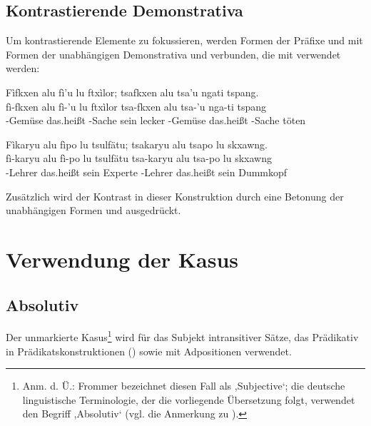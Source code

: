 \subsection{Kontrastierende Demonstrativa}
Um kontrastierende Elemente zu fokussieren, werden Formen der Präfixe  und  mit Formen der unabhängigen Demonstrativa  und  verbunden, die mit  verwendet werden:

\begin{interlin}
	\glll \Npawl{}Fìfkxen alu fì'u lu ftxìlor; tsafkxen alu tsa'u ngati tspang. \\
	fì-fkxen alu fì-'u lu ftxìlor tsa-fkxen alu tsa-'u nga-ti tspang \\
	-Gemüse das.heißt -Sache sein lecker -Gemüse das.heißt -Sache  töten \\
\end{interlin}

\begin{interlin}
	\glll \Npawl{}Fìkaryu alu fìpo lu tsulfätu; tsakaryu alu tsapo lu skxawng. \\
	fì-karyu alu fì-po lu tsulfätu tsa-karyu alu tsa-po lu skxawng \\
	-Lehrer das.heißt  sein Experte -Lehrer das.heißt  sein Dummkopf \\
\end{interlin}

\noindent Zusätzlich wird der Kontrast in dieser Konstruktion durch eine Betonung der unabhängigen Formen  und  ausgedrückt.

\section{Verwendung der Kasus}
\label{syn:cases}
\subsection{Absolutiv} Der unmarkierte Kasus\footnote{Anm. d. Ü.: Frommer bezeichnet diesen Fall als ,Subjective‘; die deutsche linguistische Terminologie, der die vorliegende Übersetzung folgt, verwendet den Begriff ,Absolutiv‘ (vgl. die Anmerkung zu ).} wird für das Subjekt intransitiver Sätze, das Prädikativ in Prädikatskonstruktionen () sowie mit Adpositionen verwendet. 

